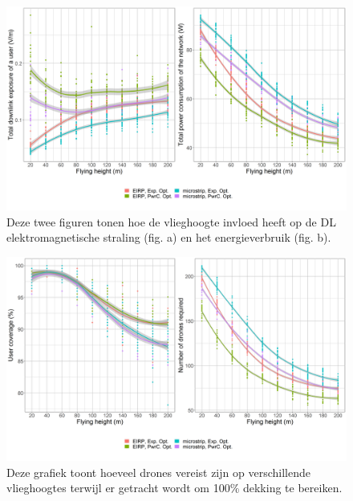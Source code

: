 \documentclass[twocolumn]{phdsymp_dutch}
\begin{document}
\begin{figure}[h!]
  \includegraphics[width=\linewidth]{../results/s3/fhvsdlAndPc.png}
  \caption{Deze twee figuren tonen hoe de vlieghoogte invloed heeft op de \acs{DL} elektromagnetische straling (fig. a) en het energieverbruik (fig. b).}
  \label{fig:s3a_dlAndPc}
\end{figure}
\vspace{2mm}
\begin{figure}[h!]
  \includegraphics[width=\linewidth]{../results/s3/fhvsnumdronesAndCov.png}
  \caption{Deze grafiek toont hoeveel drones vereist zijn op verschillende vlieghoogtes terwijl er getracht wordt om 100\% dekking te bereiken.}
  \label{fig:s3a_numDronesAndCov}
\end{figure}
\end{document}
